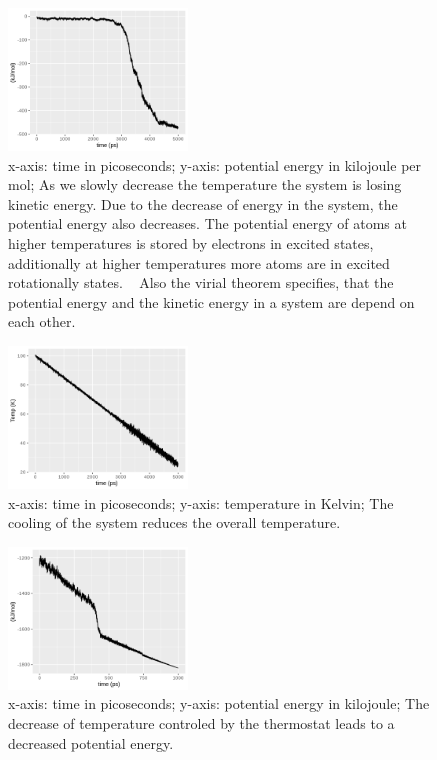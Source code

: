 \documentclass[10pt, a4paper, oneside, twocolumn]{article}
\begin{document}
\begin{figure}[t]
    \centering
    \includegraphics[width=180px]{plots/potential_energy.png}
    \caption{x-axis: time in picoseconds; y-axis: potential energy in kilojoule per mol; As we slowly decrease the temperature the system is losing kinetic energy. Due to the decrease of energy in the system, the potential energy also decreases.
The potential energy of atoms at higher temperatures is stored by electrons in excited states, additionally at higher temperatures more atoms are in excited rotationally states. ~\cite{chemguide}
Also the virial theorem specifies, that the potential energy and the kinetic energy in a system are depend on each other. ~\cite{cosmos-indirekt}}
    \label{gas_to_liquid_potentialenergy}
\end{figure}

\begin{figure}[t]
    \centering
    \includegraphics[width=180px]{plots/temp_plot.png}
    \caption{x-axis: time in picoseconds; y-axis: temperature in Kelvin; The cooling of the system reduces the overall temperature.}
    \label{gas_to_liquid_temperature}
\end{figure}

\begin{figure}[t]
    \centering
    \includegraphics[width=180px]{plots//freezing/freezing_pot_en.png}
    \caption{x-axis: time in picoseconds; y-axis: potential energy in kilojoule; The decrease of temperature controled by the thermostat leads to a decreased potential energy.}
    \label{freezing_pot_en}
\end{figure}
\end{document}
